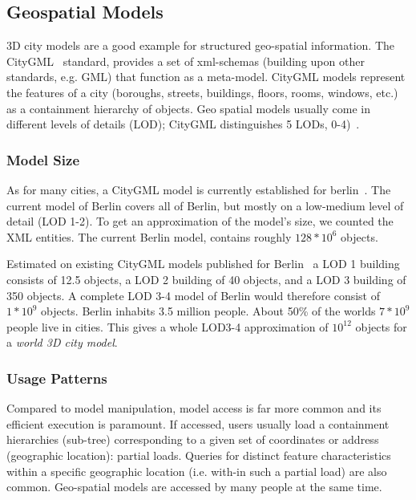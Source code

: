 \subsection{Geospatial Models}

3D city models are a good example for structured geo-spatial information. The CityGML~\cite{cityGML} standard, provides a set of xml-schemas (building upon other standards, e.g. GML) that function as a meta-model. CityGML models represent the features of a city (boroughs, streets, buildings, floors, rooms, windows, etc.) as a containment hierarchy of objects. 
Geo spatial models usually come in different levels of details (LOD); CityGML distinguishes 5 LODs, 0-4)~\cite{cityGML}. 

\subsubsection{Model Size}
As for many cities, a CityGML model is currently established for berlin~\cite{berlinGML}. The current model of Berlin covers all of Berlin, but mostly on a low-medium level of detail (LOD 1-2). To get an approximation of the model's size, we counted the XML entities. The current Berlin model, contains roughly $128*10^6$ objects. 

Estimated on existing CityGML models published for Berlin~\cite{berlinGML} a LOD 1 building consists of 12.5 objects, a LOD 2 building of 40 objects, and a LOD 3 building of 350 objects. A complete LOD 3-4 model of Berlin would therefore consist of $1*10^9$ objects. Berlin inhabits 3.5 million people. About 50\% of the worlds $7*10^9$ people live in cities. This gives a whole LOD3-4 approximation of $10^{12}$ objects for a \emph{world 3D city model}.

\subsubsection{Usage Patterns}
Compared to model manipulation, model access is far more common and its efficient execution is paramount. If accessed, users usually load a containment hierarchies (sub-tree) corresponding to a given set of coordinates or address (geographic location): partial loads. Queries for distinct feature characteristics within a specific geographic location (i.e. with-in such a partial load) are also common. Geo-spatial models are accessed by many people at the same time. 

